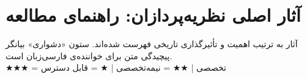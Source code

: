 \section{آثار اصلی نظریه‌پردازان: راهنمای مطالعه}
\label{sec:readings}

\begin{tcolorbox}[wavebox, title={راهنمای استفاده از این جدول}]
آثار به ترتیب اهمیت و تأثیرگذاری تاریخی فهرست شده‌اند. ستون «دشواری» بیانگر پیچیدگی متن برای خواننده‌ی فارسی‌زبان است.\\
\small\color{NeutralDark}
★★★ = تخصصی | ★★ = نیمه‌تخصصی | ★ = قابل دسترس
\end{tcolorbox}

\vspace{0.4cm}

